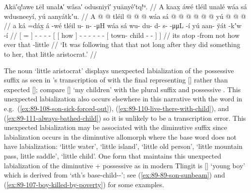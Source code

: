 \ex\label{ex:89-29-did-something-to-her}%
%
\begingl
	\glpreamble	Akā′q!awe ʟēł unałᴀ′ wâsa′ odusniyî′ yuānyê′tq!ᵘ. //
	\glpreamble	A kaax̱ áwé tléil unalé wáa sá wdusneeyí, yú aanyátkʼu. //
	\gla	{} A  @ {} {}  @ {}
		tléil  @ {} @ {} @ {}
		{} {} wáa sá {}
			 @ {} @ {} @ {} @ {} @ {} @ {}
			{} yú  @ {} @ {} @ {} {} {} //
	\glb	{} a ká =dáx̱ {} á -wé 
		tléil u- n-  -μH
		{} {} wáa sá {}
			wu- du- d- s-  -μμL -í
			{} yú aan- ÿát -kʼw -í {} {} //
	\glc	{}[   = {}]  -
		 - -  -
		{}[ {}[ how  {}]
			- - - -  - -
			{}[  town- child - - {}] {}] //
	\gld	{} its atop -from {}  {}
		not  {} {} {}
		{} {} how ever {}
			 {} {} {} {} {} {}
			{} that  {} -little {} {} {} //
	\glft	‘It was following that that not long after they did something to her, that little aristocrat.’
		//
\endgl
\xe

The noun  ‘little aristocrat’ displays unexpected labialization of the possessive suffix  as seen in \citeauthor{swanton:1909}’s transcription of  with the final  representing [] rather than expected  []; compare  [] ‘my children’ with the plural suffix  and possessive .
This unexpected labialization also occurs elsewhere in this narrative with the word  in e.g.\ (\ref{ex:89-108-son-sick-forced-out}), (\ref{ex:89-110-live-there-with-child}), and (\ref{ex:89-111-always-bathed-child}) so it is unlikely to be a transcription error.
This unexpected labialization may be associated with the diminutive suffix  since labialization occurs in the diminutive  allomorph where the base word does not have labialization:  ‘little water’,  ‘little island’,  ‘little old person’,  ‘little mountain pass, little saddle’,  ‘little child’.
One form that maintains this unexpected labialization of the diminutive + possessive as  in modern Tlingit is  [] ‘young boy’ which is derived from  ‘sth’s base-child--’; see (\ref{ex:89-89-son-sunbeam}) and (\ref{ex:89-107-boy-killed-by-poverty}) for some examples.


